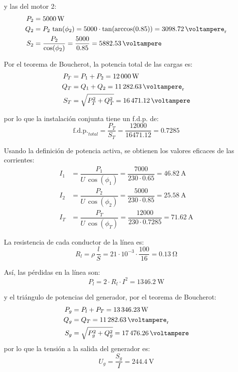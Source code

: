 y las del motor 2:
\begin{align*}
  P_2&=\qty{5000}{\watt}\\ 
  Q_2&=P_2\,\tan(\phi_2)=5000\cdot
                    \tan(\arccos(0.85))=\qty{3098.72}{\voltampere_r}\\
  S_2&=\dfrac{P_2}{\cos(\phi_2)}=\dfrac{5000}{0.85}=\qty{5882.53}{\voltampere}
\end{align*}

Por el teorema de Boucherot, la potencia total de las cargas es:
\begin{align*}
  P_T&=P_1+P_2 = \qty{12000}{\watt}\\
  Q_T&=Q_1+Q_2 = \qty{11282.63}{\voltampere_r}\\
  S_T&=\sqrt{P_T^2+Q_T^2}=\qty{16471.12}{\voltampere}
\end{align*}

por lo que la instalación conjunta tiene un f.d.p. de:
\begin{equation*}
  \mbox{f.d.p.}_{total}=\dfrac{P_T}{S_T}=\dfrac{12000}{16471.12}=0.7285
\end{equation*}

Usando la definición de potencia activa, se obtienen los valores eficaces de las corrientes:
\begin{align*}
  I_1&=\dfrac{P_1}{U\,\cos(\phi_1)}=\dfrac{7000}{230\cdot
       0.65}=\qty{46.82}{\ampere}\\
  I_2&=\dfrac{P_2}{U\,\cos(\phi_2)}=\dfrac{5000}{230\cdot
       0.85}=\qty{25.58}{\ampere}\\
  I_T&=\dfrac{P_T}{U\,\cos(\phi_T)}=\dfrac{12000}{230\cdot
       0.7285}=\qty{71.62}{\ampere}
\end{align*}

La resistencia de cada conductor de la línea es:
\begin{equation*}
  R_l=\rho\,\dfrac{l}{S}=21\cdot 10^{-3}\cdot
  \dfrac{100}{16}=\qty{0.13}{\ohm}
\end{equation*}

Así, las pérdidas en la línea son:
\begin{equation*}
  P_l= 2 \cdot R_l \cdot I^2=\qty{1346.2}{\watt}
\end{equation*}

y el triángulo de potencias del generador, por el teorema de Boucherot:
\begin{align*}
  P_g&=P_l+P_T= \qty{13346.23}{\watt}\\ Q_g&=Q_T=\qty{11282.63}{\voltampere_r}\\
  S_g&=\sqrt{P_g^2+Q_g^2}=\qty{17476.26}{\voltampere}
\end{align*} 
por lo que la tensión a la salida del generador es:
\begin{equation*}
  U_g=\dfrac{S_g}{I}=\qty{244.4}{\volt}
\end{equation*}

